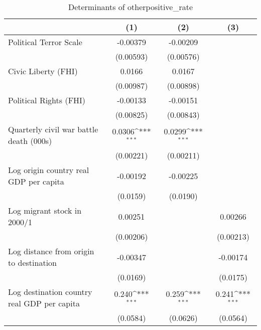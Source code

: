 \begin{table}[htbp]\centering
\def\sym#1{\ifmmode^{#1}\else\(^{#1}\)\fi}
\caption{Determinants of otherpositive\_rate}
\begin{tabular}{l*{3}{c}}
\hline\hline
                    &\multicolumn{1}{c}{(1)}         &\multicolumn{1}{c}{(2)}         &\multicolumn{1}{c}{(3)}         \\
\hline
Political Terror Scale&    -0.00379         &    -0.00209         &                     \\
                    &   (0.00593)         &   (0.00576)         &                     \\
[1em]
Civic Liberty (FHI) &      0.0166         &      0.0167         &                     \\
                    &   (0.00987)         &   (0.00898)         &                     \\
[1em]
Political Rights (FHI)&    -0.00133         &    -0.00151         &                     \\
                    &   (0.00825)         &   (0.00843)         &                     \\
[1em]
Quarterly civil war battle death (000s)&      0.0306\sym{***}&      0.0299\sym{***}&                     \\
                    &   (0.00221)         &   (0.00211)         &                     \\
[1em]
Log origin country real GDP per capita&    -0.00192         &    -0.00225         &                     \\
                    &    (0.0159)         &    (0.0190)         &                     \\
[1em]
Log migrant stock in 2000/1&     0.00251         &                     &     0.00266         \\
                    &   (0.00206)         &                     &   (0.00213)         \\
[1em]
Log distance from origin to destination&    -0.00347         &                     &    -0.00174         \\
                    &    (0.0169)         &                     &    (0.0175)         \\
[1em]
Log destination country real GDP per capita&       0.240\sym{***}&       0.259\sym{***}&       0.241\sym{***}\\
                    &    (0.0584)         &    (0.0626)         &    (0.0564)         \\

\end{tabular}
\end{table}
